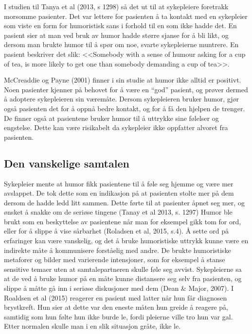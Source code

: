I studien til Tanya et al (2013, s 1298) så det ut til at sykepleiere
foretrakk morsomme pasienter. Det var lettere for pasienten å ta kontakt med en
sykepleier som viste en form for humoristisk sans i forhold til en som ikke
hadde det.  En pasient sier at man ved bruk av humor hadde større sjanse for å
bli likt, og dersom man brukte humor til å spør om noe, svarte sykepleierne
muntrere.  En pasient beskriver det slik: <<Somebody with a sense of humour
asking for a cup of tea, is more likely to get one than somebody demanding a
cup of tea>>.

McCreaddie og Payne (2001) finner i sin studie at humor ikke alltid er
positivt. Noen pasienter kjenner på behovet for å være en “god” pasient, og
prøver dermed å adoptere sykepleieren sin væremåte. Dersom sykepleieren bruker
humor, gjør også pasienten det for å oppnå bedre kontakt, og for å få den
hjelpen de trenger.  De finner også at pasientene bruker humor til å uttrykke
sine følelser og engstelse. Dette kan være risikabelt da sykepleier ikke
oppfatter alvoret fra pasienten.

\subsection{Den vanskelige samtalen}

Sykepleier mente at humor fikk pasientene til å føle seg hjemme og være mer
avslappet. De tok dette som en indikasjon på at pasienten stolte mer på dem
dersom de hadde ledd litt sammen. Dette førte til at pasienter åpnet seg mer,
og ønsket å snakke om de seriøse tingene (Tanay et al 2013, s. 1297) Humor ble
brukt som en beskyttelse av pasientene når man for eksempel gikk tom for ord,
eller for å slippe å vise sårbarhet (Roladsen et al, 2015, s.4). Å sette ord på
erfaringer kan være vanskelig, og det å bruke humoristiske uttrykk kunne være
en indirekte måte å kommunisere forståelig med andre. De brukte humoristiske
metaforer og bilder med varierende intensjoner, som for eksempel å stanse
sensitive temaer uten at samtalepartneren skulle føle seg avvist.  Sykepleierne
sa at de ved å bruke humor på en måte kunne distansere seg selv fra pasienten,
og slippe å måtte gå inn i seriøse diskusjoner med dem (Dean \&{} Major, 2007).  I
Roaldsen et al (2015) reagerer en pasient med latter når hun får diagnosen
brystkreft. Hun sier at dette var den eneste måten hun greide å reagere på,
samtidig som hun følte hun ikke burde le, fordi pleierne ville tro hun var gal.
Etter normalen skulle man i en slik situasjon gråte, ikke le.

